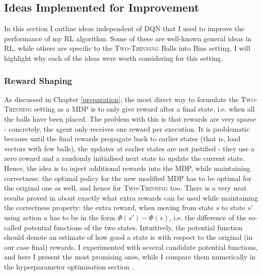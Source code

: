 \subsection{Ideas Implemented for Improvement} \label{improvementideas}


In this section I outline ideas independent of DQN that I used to improve the performance of my RL algorithm. Some of these are well-known general ideas in RL, while others are specific to the \textsc{Two-Thinning} Balls into Bins setting. I will highlight why each of the ideas were worth considering for this setting.


\subsubsection{Reward Shaping} \label{rewardshaping}

As discussed in Chapter \ref{preparation}, the most direct way to formulate the \textsc{Two-Thinning} setting as a MDP is to only give reward after a final state, i.e. when all the balls have been placed. The problem with this is that rewards are very sparse - concretely, the agent only receives one reward per execution. It is problematic because until the final rewards propagate back to earlier states (that is, load vectors with few balls), the updates at earlier states are not justified - they use a zero reward and a randomly initialised next state to update the current state. Hence, the idea is to inject additional rewards into the MDP, while maintaining correctness: the optimal policy for the new modified MDP has to be optimal for the original one as well, and hence for \textsc{Two-Thinning} too. There is a very neat results proved in \cite{ng1999rewardshaping} about exactly what extra rewards can be used while maintaining the correctness property: the extra reward, when moving from state $s$ to state $s'$ using action $a$ has to be in the form $\Phi(s')-\Phi(s)$, i.e. the difference of the so-called potential functions of the two states. Intuitively, the potential function should denote an estimate of how good a state is with respect to the original (in our case final) rewards. I experimented with several candidate potential functions, and here I present the most promising ones, while I compare them numerically in the hyperparameter optimisation section .

